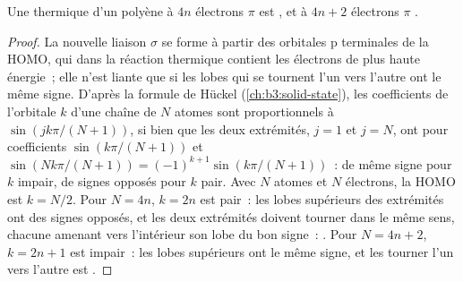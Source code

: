 \begin{theorem}\label{thm:b3:pericyclic:electrocyclic}
Une  thermique d'un polyène à $4n$ électrons $\pi$ est
, et à $4n + 2$ électrons $\pi$ .
\end{theorem}

\begin{proof}
La nouvelle liaison $\sigma$ se forme à partir des orbitales p terminales de la HOMO, qui
dans la réaction thermique contient les électrons de plus haute énergie~;
elle n'est liante que si les lobes qui se tournent l'un vers l'autre ont le
même signe. D'après la formule de Hückel
(\cref{ch:b3:solid-state}), les coefficients de l'orbitale $k$ d'une chaîne de $N$ atomes sont
proportionnels à $\sin(jk\pi/(N + 1))$, si bien que les deux extrémités, $j = 1$ et $j = N$, ont
pour coefficients $\sin(k\pi/(N + 1))$ et $\sin(Nk\pi/(N + 1)) = (-1)^{k+1}\sin(k\pi/(N + 1))$~: de même signe pour $k$ impair,
de signes opposés pour $k$ pair. Avec $N$ atomes et $N$ électrons, la HOMO est
$k = N/2$. Pour $N = 4n$, $k = 2n$ est pair~: les lobes supérieurs des extrémités ont des signes
opposés, et les deux extrémités doivent tourner dans le même sens, chacune
amenant vers l'intérieur son lobe du bon signe~: . Pour $N = 4n + 2$, $k = 2n + 1$ est impair~: les lobes supérieurs
ont le même signe, et les tourner l'un vers l'autre est .
\end{proof}

